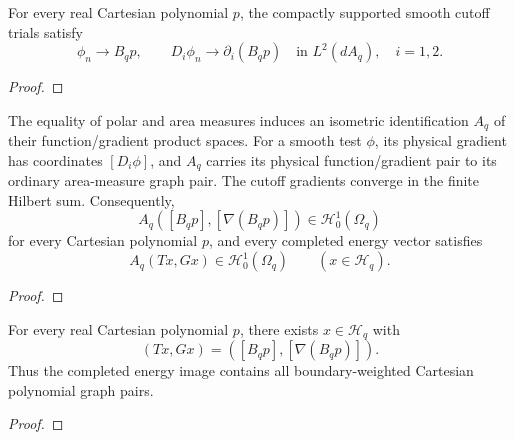 \begin{supporting}
\begin{theorem}
\label{thm:annular-cutoff-convergence}
\leanok
For every real Cartesian polynomial $p$, the compactly supported smooth
cutoff trials satisfy
\[
 \phi_n\longrightarrow B_qp,\qquad
 D_i\phi_n\longrightarrow\partial_i(B_qp)
 \quad\text{in }L^2(dA_q),\quad i=1,2.
\]
\end{theorem}
\begin{proof}
\leanok
\end{proof}


\begin{theorem}
\label{thm:annular-sobolev-inclusion}
\leanok
The equality of polar and area measures induces an isometric identification
$A_q$ of their function/gradient product spaces. For a smooth test $\phi$,
its physical gradient has coordinates $[D_i\phi]$, and $A_q$ carries its
physical function/gradient pair to its ordinary area-measure graph pair.
The cutoff gradients converge in the finite Hilbert sum. Consequently,
\[
 A_q([B_qp],[\nabla(B_qp)])\in\mathcal H_0^1(\Omega_q)
\]
for every Cartesian polynomial $p$, and every completed energy vector satisfies
\[
 A_q(Tx,Gx)\in\mathcal H_0^1(\Omega_q)\qquad(x\in\mathcal H_q).
\]
\end{theorem}
\begin{proof}
\leanok
\end{proof}


\begin{theorem}
\label{thm:annular-polynomial-graph}
\leanok
For every real Cartesian polynomial $p$, there exists $x\in\mathcal H_q$
with
\[
 (Tx,Gx)=([B_qp],[\nabla(B_qp)]).
\]
Thus the completed energy image contains all boundary-weighted Cartesian
polynomial graph pairs.
\end{theorem}
\begin{proof}
\leanok
\end{proof}


\end{supporting}
